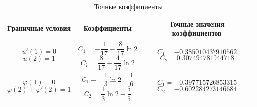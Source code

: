 \documentclass{article}
\begin{document}
\begin{table}[!h]
	\centering
	\begin{tabular}{|c|c|c|}
		\hline
		Граничные условия &
		Коэффициенты & 
		Точные значения коэффициентов \\
		\hline \hline
	
	\parbox[c]{3cm}{
		\begin{displaymath}
			u'(1) = 0
		\end{displaymath}
		\begin{displaymath}
			u(2) = 1
		\end{displaymath}
	} &
	
	\parbox[c]{3cm}{
		 \begin{displaymath}
			 C_{1} = - \frac{1}{17} - \frac{8}{17} \ln{2}
		 \end{displaymath}
		\begin{displaymath} 	
			 C_{2} = \frac{8}{17} - \frac{4}{17} \ln{2}
		 \end{displaymath}
		 } & 
		 
	\parbox[c]{4.07cm}{
		 \begin{displaymath}
			 C_{1} = -0.385010437910562 
		 \end{displaymath}
		 \begin{displaymath}
			 C_{2} = 0.307494781044718
		 \end{displaymath}
		 }\\	\hline
		
	\parbox[c]{3cm}{
		\begin{displaymath}
			\varphi(1) = 0
		\end{displaymath}
		\begin{displaymath}
			\varphi(2) + \varphi'(2) = 1
		\end{displaymath}
		} &
	
	\parbox[c]{3cm}{
		 \begin{displaymath}
			 C_{1} = - \frac{1}{3} \ln{2} - \frac{1}{6} 
		 \end{displaymath}
		\begin{displaymath} 	
			 C_{2} = \frac{1}{3} \ln{2} - \frac{5}{6}
		 \end{displaymath}
		 } & 
		 
	\parbox[c]{4.07cm}{
		 \begin{displaymath}
			 C_{1} = -0.397715726853315
		 \end{displaymath}
		 \begin{displaymath}
			 C_{2} = -0.602284273146684
		 \end{displaymath}
		 }\\	\hline
	\end{tabular}
	\caption{Точные коэффициенты}
	\label{table_exact_coefficients}
\end{table}
\end{document}
